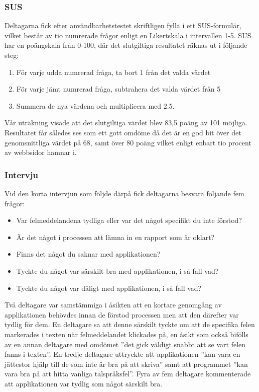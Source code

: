 \documentclass[swedish]{maucsthesis}
\begin{document}
\subsubsection{SUS}

Deltagarna fick efter användbarhetstestet skriftligen fylla i ett SUS-formulär, vilket består av tio
numrerade frågor enligt en Likertskala i intervallen 1-5. SUS har en poängskala från 0-100, där det
slutgiltiga resultatet räknas ut i följande steg:

\begin{enumerate}
\item För varje udda numrerad fråga, ta bort 1 från det valda värdet
\item För varje jämt numrerad fråga, subtrahera det valda värdet från 5
\item Summera de nya värdena och multiplicera med 2.5.
\end{enumerate}

Vår uträkning visade att det slutgiltiga värdet blev 83,5 poäng av 101 möjliga.
Resultatet får således ses som ett gott omdöme då det är en god bit över det
genomsnittliga värdet på 68, samt över 80 poäng vilket enligt
\cite{laubheimer:2018} enbart tio procent av webbsidor hamnar i.

\subsubsection{Intervju}

Vid den korta intervjun som följde därpå fick deltagarna besvara följande fem
frågor:
\begin{itemize}
\item Var felmeddelandena tydliga eller var det något specifikt du inte förstod?
\item Är det något i processen att lämna in en rapport som är oklart?
\item Finns det något du saknar med applikationen?
\item Tyckte du något var särskilt bra med applikationen, i så fall vad?
\item Tyckte du något var dåligt med applikationen, i så fall vad?
\end{itemize}

Två deltagare var samstämmiga i åsikten att en kortare genomgång av
applikationen behövdes innan de förstod processen men att den därefter var
tydlig för dem. En deltagare sa att denne särskilt tyckte om att de specifika
felen markerades i texten när felmeddelandet klickades på, en åsikt som också
bifölls av en annan deltagare med omdömet ”det gick väldigt snabbt att se vart
felen fanns i texten”. En tredje deltagare uttryckte att applikationen ”kan vara
en jättestor hjälp till de som inte är bra på att skriva” samt att programmet
”kan vara bra på att hitta vanliga talspråksfel”. Fyra av fem deltagare
kommenterade att applikationen var tydlig som något särskilt bra.
\end{document}
